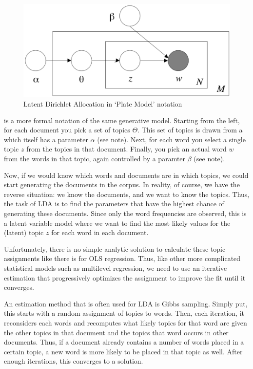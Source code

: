 \begin{figure}
  \includegraphics[width=\linewidth]{chapter12/lda.png}
  \caption{Latent Dirichlet Allocation in `Plate Model' notation \citep[fig. 1]{blei03}}\label{fig:lda}
\end{figure}

 is a more formal notation of the same generative model.
Starting from the left, for each document you pick a set of topics $\Theta$.
This set of topics is drawn from a  which itself has a parameter $\alpha$
(see note).
Next, for each word you select a single topic $z$ from the topics in that document.
Finally, you pick an actual word $w$ from the words in that topic, again controlled by a paramter $\beta$ (see note).

Now, if we would know which words and documents are in which topics, we could start generating the documents in the corpus.
In reality, of course, we have the reverse situation:
we know the documents, and we want to know the topics.
Thus, the task of LDA is to find the parameters that have the highest chance of generating these documents.
Since only the word frequencies are observed, this is a latent variable model where we want to find the
most likely values for the (latent) topic $z$ for each word in each document. 

Unfortunately, there is no simple analytic solution to calculate these topic assignments
like there is for OLS regression.
Thus, like other more complicated statistical models such as multilevel regression,
we need to use an iterative estimation that progressively optimizes the assignment to improve the fit until it converges.

An estimation method that is often used for LDA is Gibbs sampling.
Simply put, this starts with a random assignment of topics to words.
Then, each iteration, it reconsiders each words and recomputes what likely topics for that word are
given the other topics in that document and the topics that word occurs in  other documents.
Thus, if a document already contains a number of words placed in a certain topic,
a new word is more likely to be placed in that topic as well.
After enough iterations, this converges to a solution. 

